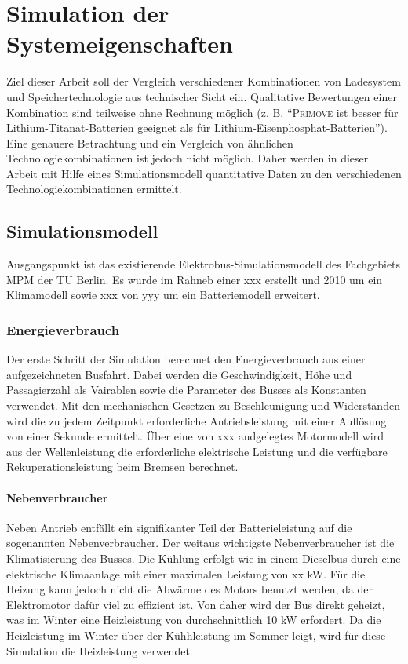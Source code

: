 \chapter{Simulation der Systemeigenschaften}
\label{chap4}
Ziel dieser Arbeit soll der Vergleich verschiedener Kombinationen von Ladesystem und Speichertechnologie aus technischer Sicht ein. Qualitative Bewertungen einer Kombination sind teilweise ohne Rechnung möglich (z. B. "`\textsc{Primove} ist besser für Lithium-Titanat-Batterien geeignet als für Lithium-Eisenphosphat-Batterien"'). Eine genauere Betrachtung und ein Vergleich von ähnlichen Technologiekombinationen ist jedoch nicht möglich. Daher werden in dieser Arbeit mit Hilfe eines Simulationsmodell quantitative Daten zu den verschiedenen Technologiekombinationen ermittelt.

\section{Simulationsmodell}
 Ausgangspunkt ist das existierende Elektrobus-Simulationsmodell des Fachgebiets MPM der TU Berlin. Es wurde im Rahneb einer xxx erstellt und 2010 um ein Klimamodell sowie xxx von yyy um ein Batteriemodell erweitert.

\subsection{Energieverbrauch}
Der erste Schritt der Simulation berechnet den Energieverbrauch aus einer aufgezeichneten Busfahrt. Dabei werden die Geschwindigkeit, Höhe und Passagierzahl als Vairablen sowie die Parameter des Busses als Konstanten verwendet. Mit den mechanischen Gesetzen zu Beschleunigung und Widerständen wird die zu jedem Zeitpunkt erforderliche Antriebsleistung mit einer Auflösung von einer Sekunde ermittelt. Über eine von xxx  audgelegtes Motormodell wird aus der Wellenleistung die erforderliche elektrische Leistung und die verfügbare Rekuperationsleistung beim Bremsen berechnet.

\subsubsection{Nebenverbraucher}
Neben Antrieb entfällt ein signifikanter Teil der Batterieleistung auf die sogenannten Nebenverbraucher. Der weitaus wichtigste Nebenverbraucher ist die Klimatisierung des Busses. Die Kühlung erfolgt wie in einem Dieselbus durch eine elektrische Klimaanlage mit einer maximalen Leistung von xx kW. Für die Heizung kann jedoch nicht die Abwärme des Motors benutzt werden, da der Elektromotor dafür viel zu effizient ist. Von daher wird der Bus direkt geheizt, was im Winter eine Heizleistung von durchschnittlich 10 kW erfordert. Da die Heizleistung im Winter über der Kühhleistung im Sommer leigt, wird für diese Simulation die Heizleistung verwendet.

